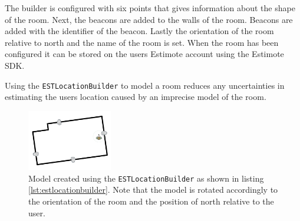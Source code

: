 The builder is configured with six points that gives information about the shape of the room. Next, the beacons are added to the walls of the room. Beacons are added with the identifier of the beacon. Lastly the orientation of the room relative to north and the name of the room is set. When the room has been configured it can be stored on the users Estimote account using the Estimote SDK.

Using the \texttt{ESTLocationBuilder} to model a room reduces any uncertainties in estimating the users location caused by an imprecise model of the room.

\begin{figure}
\centering
\includegraphics[width=0.33\textwidth]{images/living-room}
\caption{Model created using the \texttt{ESTLocationBuilder} as shown in listing \ref{lst:estlocationbuilder}. Note that the model is rotated accordingly to the orientation of the room and the position of north relative to the user.}
\label{fig:estlocationbuilder-livingroom}
\end{figure}
